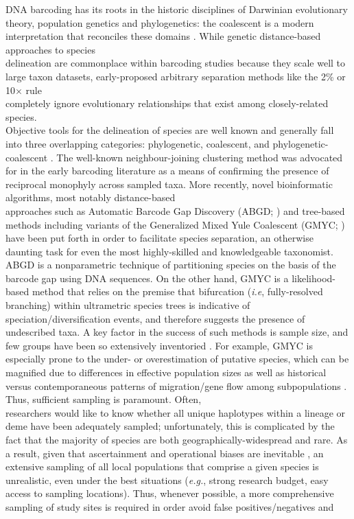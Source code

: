 DNA barcoding has its roots in the historic disciplines of Darwinian evolutionary \\ theory, population genetics and phylogenetics: the coalescent is a modern interpretation that reconciles these domains \cite{rosenberg2002genealogical}. While genetic distance-based approaches to species \\ delineation are commonplace within barcoding studies because they scale well to large taxon datasets, early-proposed arbitrary separation methods like the 2\% or 10$\times$ rule \\ completely ignore evolutionary relationships that exist among closely-related species. \\ Objective tools for the delineation of species are well known and generally fall into three overlapping categories: phylogenetic, coalescent, and phylogenetic-coalescent \cite{hubert2015dna}. The well-known neighbour-joining clustering method was advocated for in the early barcoding literature as a means of confirming the presence of reciprocal monophyly across sampled taxa. More recently, novel bioinformatic algorithms, most notably distance-based \\ approaches such as Automatic Barcode Gap Discovery (ABGD; \cite{puillandre2011abgd}) and tree-based \\ methods including variants of the Generalized Mixed Yule Coalescent (GMYC; \cite{monaghan2009accelerated, pons2006sequence}) have been put forth in order to facilitate species separation, an otherwise daunting task for even the most highly-skilled and knowledgeable taxonomist. ABGD is a nonparametric technique of partitioning species on the basis of the barcode gap using DNA sequences. On the other hand, GMYC is a likelihood-based method that relies on the premise that bifurcation (\textit{i.e}, fully-resolved branching) within ultrametric species trees is indicative of \\ speciation/diversification events, and therefore suggests the presence of undescribed taxa.  A key factor in the success of such methods is sample size, and few groups have been so extensively inventoried \cite{hubert2015dna}. For example, GMYC is especially prone to the under- or overestimation of putative species, which can be magnified due to differences in effective population sizes as well as historical versus contemporaneous patterns of migration/gene flow among subpopulations     \cite{lohse2009can, papadopoulou2009sampling}. Thus, sufficient sampling is paramount. Often, \\ researchers would like to know whether all unique haplotypes within a lineage or deme have been adequately sampled; unfortunately, this is complicated by the fact that the majority of species are both geographically-widespread and rare. As a result, given that ascertainment and operational biases are inevitable \cite{mutanen2016species}, an extensive sampling of all local populations that comprise a given species is unrealistic, even under the best situations (\textit{e.g.}, strong research budget, easy access to sampling locations). Thus, whenever possible, a more comprehensive sampling of study sites is required in order avoid false positives/negatives and 